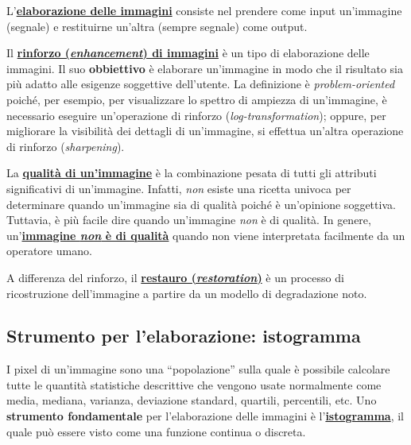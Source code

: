 \documentclass[a4paper]{article}
\newcommand{\dquotes}[1]{``#1''}
\begin{document}
	L'\textcolor{Red3}{\textbf{\underline{elaborazione delle immagini}}} consiste nel prendere come input un'immagine (segnale) e restituirne un'altra (sempre segnale) come output.\newline
	
	\noindent
	Il \textcolor{Red3}{\textbf{\underline{rinforzo (\emph{enhancement}) di immagini}}} è un tipo di elaborazione delle immagini. Il suo \textbf{obbiettivo} è elaborare un'immagine in modo che il risultato sia più adatto alle esigenze soggettive dell'utente. La definizione è \emph{problem-oriented} poiché, per esempio, per visualizzare lo spettro di ampiezza di un'immagine, è necessario eseguire un'operazione di rinforzo (\emph{log-transformation}); oppure, per migliorare la visibilità dei dettagli di un'immagine, si effettua un'altra operazione di rinforzo (\emph{sharpening}).\newline
	
	\noindent
	La \textcolor{Red3}{\textbf{\underline{qualità di un'immagine}}} è la combinazione pesata di tutti gli attributi significativi di un'immagine. Infatti, \emph{non} esiste una ricetta univoca per determinare quando un'immagine sia di qualità poiché è un'opinione soggettiva. Tuttavia, è più facile dire quando un'immagine \emph{non} è di qualità. In genere, un'\textcolor{Red3}{\textbf{\underline{immagine \emph{non} è di qualità}}} quando non viene interpretata facilmente da un operatore umano.\newline
	
	\noindent
	A differenza del rinforzo, il \textcolor{Red3}{\textbf{\underline{restauro (\emph{restoration})}}} è un processo di ricostruzione dell'immagine a partire da un modello di degradazione noto.
	
	\newpage
	
	\subsection{Strumento per l'elaborazione: istogramma}
	
	I pixel di un'immagine sono una \dquotes{popolazione} sulla quale è possibile calcolare tutte le quantità statistiche descrittive che vengono usate normalmente come media, mediana, varianza, deviazione standard, quartili, percentili, etc. Uno \textbf{strumento fondamentale} per l'elaborazione delle immagini è l'\textcolor{Red3}{\textbf{\underline{istogramma}}}, il quale può essere visto come una funzione continua o discreta.\newline
	
\end{document}
